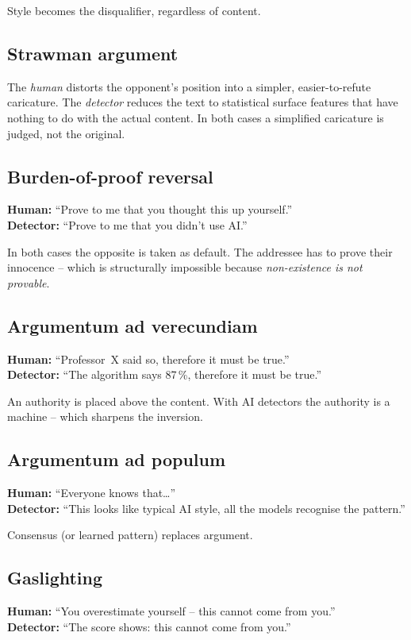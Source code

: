 Style becomes the disqualifier, regardless of content.

\subsection{Strawman argument}
The \emph{human} distorts the opponent's position into a simpler,
easier-to-refute caricature. The \emph{detector} reduces the text
to statistical surface features that have nothing to do with the
actual content. In both cases a simplified caricature is judged,
not the original.

\subsection{Burden-of-proof reversal}
\textbf{Human:} \enquote{Prove to me that you thought this up
yourself.}\\
\textbf{Detector:} \enquote{Prove to me that you didn't use AI.}

In both cases the opposite is taken as default. The addressee has
to prove their innocence -- which is structurally impossible
because \emph{non-existence is not provable}.

\subsection{Argumentum ad verecundiam}
\textbf{Human:} \enquote{Professor~X said so, therefore it must be
true.}\\
\textbf{Detector:} \enquote{The algorithm says 87\,\%, therefore it
must be true.}

An authority is placed above the content. With AI detectors the
authority is a machine -- which sharpens the inversion.

\subsection{Argumentum ad populum}
\textbf{Human:} \enquote{Everyone knows that\ldots}\\
\textbf{Detector:} \enquote{This looks like typical AI style, all
the models recognise the pattern.}

Consensus (or learned pattern) replaces argument.

\subsection{Gaslighting}
\textbf{Human:} \enquote{You overestimate yourself -- this cannot
come from you.}\\
\textbf{Detector:} \enquote{The score shows: this cannot come from
you.}

